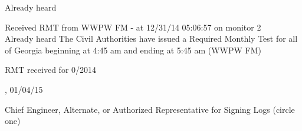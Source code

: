 \documentclass{article}
\begin{document}
\medskip

\medskip

 \hspace{20 pt}Already heard 

\medskip

\hspace{20 pt}     Received RMT from WWPW FM - at 12/31/14 05:06:57 on monitor 2\\      Already heard The Civil Authorities have issued a Required Monthly Test for all of Georgia beginning at 4:45 am and ending at 5:45 am (WWPW FM) 

\medskip

\medskip

\hspace{20 pt} RMT received for 0/2014

\medskip

 \underline{\hspace{100 pt}}, 01/04/15

\medskip

{\large{Chief Engineer, Alternate, or Authorized  Representative for Signing Logs \newline (circle one)}} 

\medskip

 \noindent 

\medskip
\end{document}
